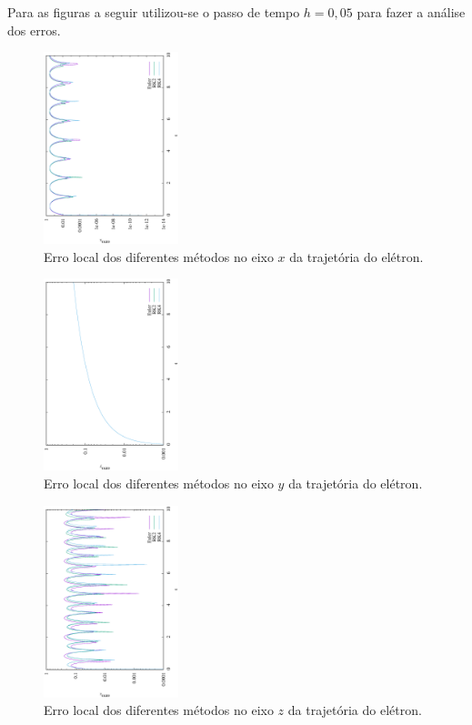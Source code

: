 \documentclass[brazilian, 12pt, a4paper, final]{article}
\begin{document}
\begin{multicols*}{2}
Para as figuras a seguir utilizou-se o passo de tempo $h=0,05$ para fazer a análise dos erros.

\begin{figure}[H]
  \centering
 \includegraphics[width=0.35\textwidth,angle=-90]{figuras/ex_error.eps}
  \caption{Erro local dos diferentes métodos no eixo $x$ da trajetória do elétron.}
\end{figure}

\begin{figure}[H]
  \centering
 \includegraphics[width=0.35\textwidth,angle=-90]{figuras/ey_error.eps}
  \caption{Erro local dos diferentes métodos no eixo $y$ da trajetória do elétron.}
\end{figure}

\begin{figure}[H]
  \centering
 \includegraphics[width=0.35\textwidth,angle=-90]{figuras/ez_error.eps}
  \caption{Erro local dos diferentes métodos no eixo $z$ da trajetória do elétron.}
\end{figure}


\end{multicols*}
\end{document}
